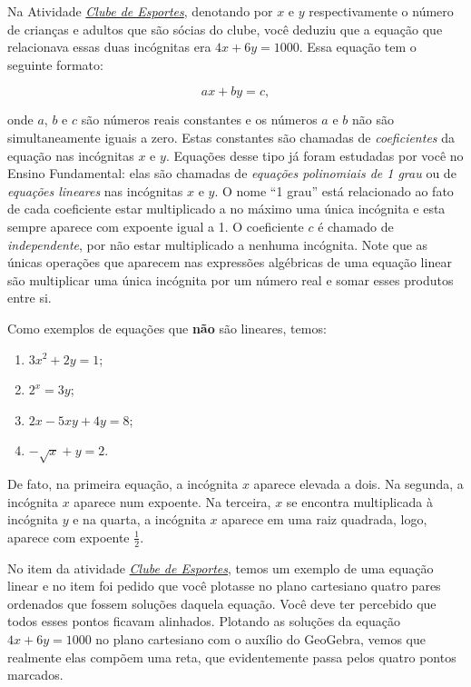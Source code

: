 \label{\detokenize{AF107-3:equaçoes-lineares-2-incognitas}}\label{\detokenize{AF107-3::doc}}

Na Atividade \textit{\hyperref[clube]{Clube de Esportes}}, denotando por $x$ e $y$ respectivamente o número de crianças e adultos que são sócias do clube, você deduziu que a equação que relacionava essas duas incógnitas era $4x + 6y = 1000$. Essa equação tem o seguinte formato:

$$
ax + by =c,
$$

onde $a$, $b$ e $c$ são números reais constantes e os números $a$ e $b$ não são simultaneamente iguais a zero. Estas constantes são chamadas de \emph{coeficientes} da equação nas incógnitas $x$ e $y$. Equações desse tipo já foram estudadas por você no Ensino Fundamental: elas são chamadas de \emph{equações polinomiais de 1 grau} ou de \emph{equações lineares} nas incógnitas $x$ e $y$. O nome “1 grau”{} está relacionado ao fato de cada coeficiente estar multiplicado a no máximo uma única incógnita e esta sempre aparece com expoente igual a 1. O coeficiente $c$ é chamado de \emph{independente}, por não estar multiplicado a nenhuma incógnita. Note que as únicas operações que aparecem nas expressões algébricas de uma equação linear são multiplicar uma única incógnita por um número real e somar esses produtos entre si.

Como exemplos de equações que \textbf{não} são lineares, temos: 

\begin{enumerate}
\item{}
$3x^2 + 2y = 1$;

\item{}
$2^x = 3y$;

\item{}
$2x - 5xy + 4y = 8$;

\item{}
$-\sqrt{x} +y = 2$.

\end{enumerate}

De fato, na primeira equação, a incógnita $x$ aparece elevada a dois. Na segunda, a incógnita $x$ aparece num expoente. Na terceira, $x$ se encontra multiplicada à incógnita $y$ e na quarta, a incógnita $x$ aparece em uma raiz quadrada, logo, aparece com expoente $\frac{1}{2}$.

	No item  da atividade \hyperref[clube]{\textit{Clube de Esportes}}, temos um exemplo de uma equação linear e no item  foi pedido que você plotasse no plano cartesiano quatro pares ordenados que fossem soluções daquela equação. Você deve ter percebido que todos esses pontos ficavam alinhados. Plotando as soluções da equação $4x+6y = 1000$ no plano cartesiano com o auxílio do GeoGebra, vemos que realmente elas compõem uma reta, que evidentemente passa pelos quatro pontos marcados.
	
